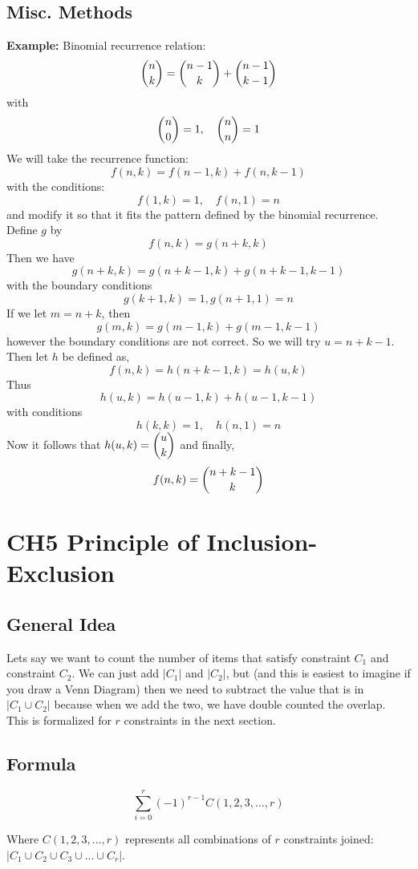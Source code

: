\documentclass[12pt]{article}
\begin{document}
	\subsection{Misc. Methods}
	\textbf{Example: } Binomial recurrence relation: 
	\[
		\dbinom{n}{k} = \dbinom{n-1}{k} + \dbinom{n-1}{k-1}
	\] with 
	\[
		\dbinom{n}{0} = 1, \quad \dbinom{n}{n} = 1
	\]
	We will take the recurrence function: 
	\[
		f(n,k) = f(n-1, k) + f(n, k-1)
	\]
	with the conditions: 
	\[
		f(1,k) = 1, \quad f(n, 1) = n
	\]
	and modify it so that it fits the pattern defined by the binomial recurrence. Define $ g $ by 
	\[
		f(n,k) = g(n+k, k)
	\]
	Then we have 
	\[
		g(n+k, k) = g(n+k-1, k) + g(n + k-1, k-1)
	\]
	with the boundary conditions 
	\[
		g(k+1, k) = 1, g(n+1, 1) = n
	\]
	If we let $ m= n+k $, then 
	\[ g(m,k) = g(m-1, k) + g(m-1,k-1) \]
	however the boundary conditions are not correct. So we will try $ u=n+k-1 $. Then let $ h $ be defined as, 
	\[
		f(n,k) = h(n+k-1, k) = h(u,k)
	\]
	Thus
	\[
		h(u,k) = h(u-1, k) + h(u-1, k-1)
	\]
	with conditions 
	\[
		h(k,k) = 1, \quad h(n,1)= n
	\]
	Now it follows that $ h(u,k) = \dbinom{u}{k} $ and finally, 
	\[
		f(n,k) = \dbinom{n+k-1}{k}
	\]
	
	\section{CH5 Principle of Inclusion-Exclusion}
	
	\subsection{General Idea}
	Lets say we want to count the number of items that satisfy constraint $C_1$ and constraint $C_2$. We can just add $|C_1|$ and $|C_2|$, but (and this is easiest to imagine if you draw a Venn Diagram) then we need to subtract the value that is in  $|C_1 \cup C_2|$ because when we add the two, we have double counted the overlap. This is formalized for $r$ constraints in the next section.
	
	\subsection{Formula}
		\[ \sum_{i=0}^{r} (-1)^{r-1}C(1,2,3 ,..., r)  \] 
		\begin{center} Where $C(1,2,3,...,r)$ represents all combinations of $r$ constraints joined: $|C_1 \cup C_2 \cup C_3 \cup ... \cup C_r|$.  \end{center} 
	
\end{document}

